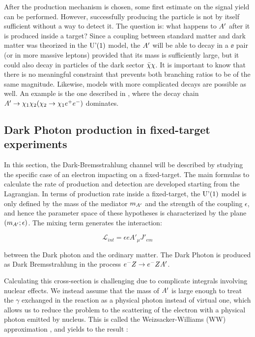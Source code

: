 After the production mechanism is chosen, some first estimate on the signal yield can be performed. However, successfully producing the particle is not by itself sufficient without a way to detect it. The question is: what happens to $A'$ after it is produced inside a target? Since a coupling between standard matter and dark matter was theorized in the $\textrm{U'(1)}$ model, the $A'$ will be able to decay in a $\ee$ pair (or in more massive leptons) provided that its mass is sufficiently large, but it could also decay in particles of the dark sector $\bar{\chi} \chi$. It is important to know that there is no meaningful constraint that prevents both branching ratios to be of the same magnitude. Likewise, models with more complicated decays are possible as well. An example is the one described in \cite{Mohlabeng_2019}, where the decay chain $A' \to \chi_1 \chi_2(\chi_2 \to \chi_1 e^+e^-)$ dominates. 

\subsection{Dark Photon production in fixed-target experiments}
\label{ch1:sec:dm-u1model}

In this section, the Dark-Bremsstrahlung channel will be described by studying the specific case of an electron impacting on a fixed-target. The main formulas to calculate the rate of production and detection are developed starting from the Lagrangian. In terms of production rate inside a fixed-target, the $\textrm{U'(1)}$ model is only defined by the mass of the mediator $m_{A'}$ and the strength of the coupling $\epsilon$, and hence the parameter space of these hypotheses is characterized by the plane $(m_{A'};\epsilon)$. The mixing term generates the interaction:

\begin{equation}
  \label{eq:dm-interaction}
  \mathcal{L}_{int} = \epsilon e A'_{\mu}J'_{em}
\end{equation}

between the Dark photon and the ordinary matter. The Dark Photon is produced as Dark Bremsstrahlung in the process $e^- Z \to e^- Z A'$.

Calculating this cross-section is challenging due to complicate integrals involving nuclear effects. We instead assume that the mass of $A'$ is large enough to treat the $\gamma$ exchanged in the reaction as a physical photon instead of virtual one, which allows us to reduce the problem to the scattering of the electron with a physical photon emitted by nucleus. This is called the Weizsacker-Williams (WW) approximation \cite{Kim:1973he}, and yields to the result \cite{jdb}:


